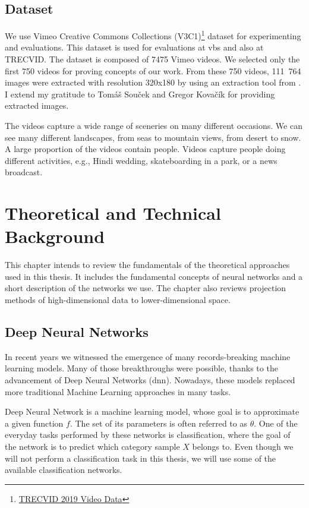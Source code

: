 \section{Dataset}
\label{s:dataset}

We use Vimeo Creative Commons Collections (V3C1)\footnote{\href{https://www-nlpir.nist.gov/projects/tv2019/data.html}{TRECVID 2019 Video Data}} dataset for experimenting and evaluations. This dataset is used for evaluations at \acrshort{vbs} and also at TRECVID. The dataset is composed of 7475 Vimeo videos. We selected only the first 750 videos for proving concepts of our work. From these 750 videos, 111\ 764 images were extracted with resolution 320x180 by using an extraction tool from \cite{lokovc2019framework}. I extend my gratitude to Tomáš Souček and Gregor Kovačík for providing extracted images.

The videos capture a wide range of sceneries on many different occasions. We can see many different landscapes, from seas to mountain views, from desert to snow. A large proportion of the videos contain people. Videos capture people doing different activities, e.g., Hindi wedding, skateboarding in a park, or a news broadcast.


\chapter{Theoretical and Technical Background}
\label{ch:technical_background}

This chapter intends to review the fundamentals of the theoretical approaches used in this thesis. It includes the fundamental concepts of neural networks and a short description of the networks we use. The chapter also reviews projection methods of high-dimensional data to lower-dimensional space.

\section{Deep Neural Networks}

In recent years we witnessed the emergence of many records-breaking machine learning models. Many of those breakthroughs were possible, thanks to the advancement of Deep Neural Networks (\acrshort{dnn}). Nowadays, these models replaced more traditional Machine Learning approaches in many tasks.

Deep Neural Network is a machine learning model, whose goal is to approximate a given function \(f\). The set of its parameters is often referred to as \(\theta\). One of the everyday tasks performed by these networks is classification, where the goal of the network is to predict which category sample \(X\) belongs to. Even though we will not perform a classification task in this thesis, we will use some of the available classification networks.

